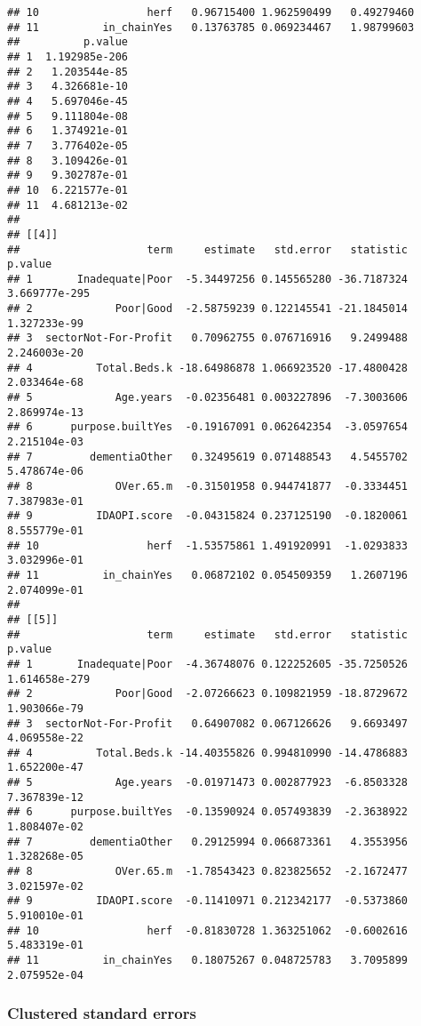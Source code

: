 \documentclass[]{article}
\begin{document}
\begin{verbatim}
## 10                 herf   0.96715400 1.962590499   0.49279460
## 11          in_chainYes   0.13763785 0.069234467   1.98799603
##          p.value
## 1  1.192985e-206
## 2   1.203544e-85
## 3   4.326681e-10
## 4   5.697046e-45
## 5   9.111804e-08
## 6   1.374921e-01
## 7   3.776402e-05
## 8   3.109426e-01
## 9   9.302787e-01
## 10  6.221577e-01
## 11  4.681213e-02
## 
## [[4]]
##                    term     estimate   std.error   statistic       p.value
## 1       Inadequate|Poor  -5.34497256 0.145565280 -36.7187324 3.669777e-295
## 2             Poor|Good  -2.58759239 0.122145541 -21.1845014  1.327233e-99
## 3  sectorNot-For-Profit   0.70962755 0.076716916   9.2499488  2.246003e-20
## 4          Total.Beds.k -18.64986878 1.066923520 -17.4800428  2.033464e-68
## 5             Age.years  -0.02356481 0.003227896  -7.3003606  2.869974e-13
## 6      purpose.builtYes  -0.19167091 0.062642354  -3.0597654  2.215104e-03
## 7         dementiaOther   0.32495619 0.071488543   4.5455702  5.478674e-06
## 8             OVer.65.m  -0.31501958 0.944741877  -0.3334451  7.387983e-01
## 9          IDAOPI.score  -0.04315824 0.237125190  -0.1820061  8.555779e-01
## 10                 herf  -1.53575861 1.491920991  -1.0293833  3.032996e-01
## 11          in_chainYes   0.06872102 0.054509359   1.2607196  2.074099e-01
## 
## [[5]]
##                    term     estimate   std.error   statistic       p.value
## 1       Inadequate|Poor  -4.36748076 0.122252605 -35.7250526 1.614658e-279
## 2             Poor|Good  -2.07266623 0.109821959 -18.8729672  1.903066e-79
## 3  sectorNot-For-Profit   0.64907082 0.067126626   9.6693497  4.069558e-22
## 4          Total.Beds.k -14.40355826 0.994810990 -14.4786883  1.652200e-47
## 5             Age.years  -0.01971473 0.002877923  -6.8503328  7.367839e-12
## 6      purpose.builtYes  -0.13590924 0.057493839  -2.3638922  1.808407e-02
## 7         dementiaOther   0.29125994 0.066873361   4.3553956  1.328268e-05
## 8             OVer.65.m  -1.78543423 0.823825652  -2.1672477  3.021597e-02
## 9          IDAOPI.score  -0.11410971 0.212342177  -0.5373860  5.910010e-01
## 10                 herf  -0.81830728 1.363251062  -0.6002616  5.483319e-01
## 11          in_chainYes   0.18075267 0.048725783   3.7095899  2.075952e-04
\end{verbatim}

\subsubsection{Clustered standard
errors}\label{clustered-standard-errors}
\end{document}
